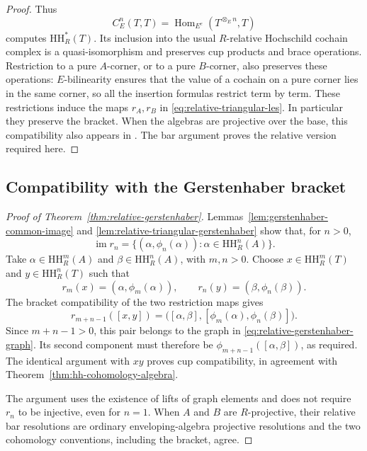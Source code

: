 \documentclass[12pt,a4paper,english,reqno]{amsart}
\numberwithin{equation}{section}
\theoremstyle{plain}
\theoremstyle{definition}
\begin{document}
\begin{proof}
Thus
\[
 C_E^n(T,T)=\operatorname{Hom}_{E^e}
                      (T^{\otimes_E n},T)
\]
computes $\mathrm{HH}_R^*(T)$.  Its inclusion into the usual
$R$-relative Hochschild cochain complex is a quasi-isomorphism and
preserves cup products and brace operations.  Restriction to a pure
$A$-corner, or to a pure $B$-corner, also preserves these operations:
$E$-bilinearity ensures that the value of a cochain on a pure corner
lies in the same corner, so all the insertion formulas restrict
term by term.  These restrictions induce the maps $r_A,r_B$ in
\eqref{eq:relative-triangular-les}.  In particular they preserve
the bracket.  When the algebras are projective over the base, this compatibility
also appears in \cite[pp.~372--373]{BendiffalahGuin2006}.
The bar argument proves the relative version required here.
\end{proof}

\subsection{Compatibility with the Gerstenhaber bracket}

\begin{proof}[Proof of Theorem~\ref{thm:relative-gerstenhaber}]
Lemmas~\ref{lem:gerstenhaber-common-image} and
\ref{lem:relative-triangular-gerstenhaber} show that, for $n>0$,
\begin{equation}
 \operatorname{im}r_n
   =\{(\alpha,\phi_n(\alpha)):
                       \alpha\in\mathrm{HH}^n_R(A)\}.
 \label{eq:relative-gerstenhaber-graph}
\end{equation}
Take $\alpha\in\mathrm{HH}^m_R(A)$ and
$\beta\in\mathrm{HH}^n_R(A)$, with $m,n>0$.  Choose
$x\in\mathrm{HH}^m_R(T)$ and $y\in\mathrm{HH}^n_R(T)$ such that
\[
 r_m(x)=(\alpha,\phi_m(\alpha)),\qquad
 r_n(y)=(\beta,\phi_n(\beta)).
\]
The bracket compatibility of the two restriction maps gives
\[
 r_{m+n-1}([x,y])
   =\bigl([\alpha,\beta],
           [\phi_m(\alpha),\phi_n(\beta)]\bigr).
\]
Since $m+n-1>0$, this pair belongs to the graph in
\eqref{eq:relative-gerstenhaber-graph}.  Its second component must
therefore be $\phi_{m+n-1}([\alpha,\beta])$, as required.
The identical argument with $xy$ proves cup compatibility, in
agreement with Theorem~\ref{thm:hh-cohomology-algebra}.

The argument uses the existence of lifts of graph elements and does
not require $r_n$ to be injective, even for $n=1$.  When $A$ and $B$
are $R$-projective, their relative bar resolutions are ordinary
enveloping-algebra projective resolutions and the two cohomology
conventions, including the bracket, agree.
\end{proof}
\end{document}
